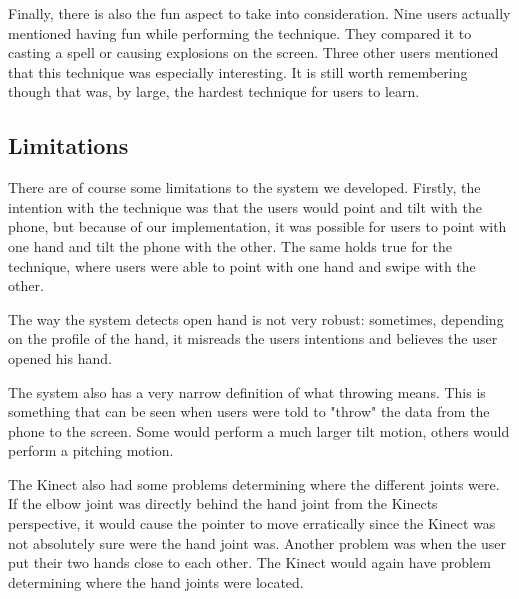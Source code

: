 Finally, there is also the fun aspect to take into consideration. Nine users actually mentioned having fun while performing the \pinch technique. 
They compared it to casting a spell or causing explosions on the screen. Three other users mentioned that this technique was especially interesting. 
It is still worth remembering though that \pinch was, by large, the hardest technique for users to learn. 



\subsection{Limitations}
There are of course some limitations to the system we developed. 
Firstly, the intention with the \tilt technique was that the users would point and tilt with the phone, but because of our implementation, it was possible for users to point with one hand and tilt the phone with the other.
The same holds true for the \swipe technique, where users were able to point with one hand and swipe with the other.

The way the system detects open hand is not very robust: sometimes, depending on the profile of the hand, it misreads the users intentions and believes the user opened his hand. 

The system also has a very narrow definition of what throwing means. 
This is something that can be seen when users were told to "throw" the data from the phone to the screen.
Some would perform a much larger tilt motion, 
others would perform a pitching motion. 

The Kinect also had some problems determining where the different joints were.
If the elbow joint was directly behind the hand joint from the Kinects perspective, it would cause the pointer to move erratically since the Kinect was not absolutely sure were the hand joint was.
Another problem was when the user put their two hands close to each other. 
The Kinect would again have problem determining where the hand joints were located. 
